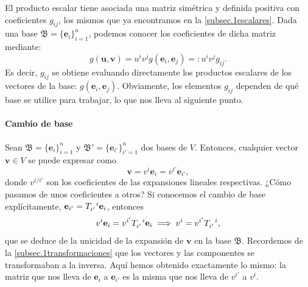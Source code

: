 El producto escalar tiene asociada una matriz simétrica y definida positiva con coeficientes \(g_{ij}\), los mismos que ya encontramos en la \cref{subsec.1escalares}. Dada una base \(\mathfrak{B} = \{\mathbf{e}_i\}_{i=1}^n\), podemos conocer los coeficientes de dicha matriz mediante:
\begin{equation}
    g(\mathbf{u},\mathbf{v}) = u^iv^j g(\mathbf{e}_i,\mathbf{e}_j) =: u^i v^j g_{ij}.
\end{equation}
Es decir, \(g_{ij}\) se obtiene evaluando directamente los productos escalares de los vectores de la base: \(g(\mathbf{e}_i,\mathbf{e}_j)\). Obviamente, los elementos \(g_{ij}\) dependen de qué base se utilice para trabajar, lo que nos lleva al siguiente punto.

\paragraph{Cambio de base} Sean \(\mathfrak{B} = \{\mathbf{e}_i\}_{i=1}^n\) y \(\mathfrak{B}' = \{\mathbf{e}_{i'}\}_{i'=1}^n\) dos bases de \(V\). Entonces, cualquier vector \(\mathbf{v}\in V\) se puede expresar como
\begin{equation}
    \mathbf{v} = v^i \mathbf{e}_i = v^{i'} \mathbf{e}_{i'},
\end{equation}
donde \(v^{i/i'}\) son los coeficientes de las expansiones lineales respectivas. ¿Cómo pasamos de unos coeficientes a otros? Si conocemos el cambio de base explícitamente, \(\mathbf{e}_{i'} = \tensor{T}{_{i'}^i} \mathbf{e}_i\), entonces
\begin{equation}
    v^i\mathbf{e}_i = v^{i'}\tensor{T}{_{i'}^i} \mathbf{e}_i \implies v^i = v^{i'}\tensor{T}{_{i'}^i},
\end{equation}
que se deduce de la unicidad de la expansión de \(\mathbf{v}\) en la base \(\mathfrak{B}\).  Recordemos de la \cref{subsec.1transformaciones} que los vectores y las componentes se transformaban a la inversa. Aquí hemos obtenido exactamente lo mismo: la matriz que nos lleva de \(\mathbf{e}_{i}\) a \(\mathbf{e}_{i'}\) es la misma que nos lleva de \(v^{i'}\) a \(v^i\).

